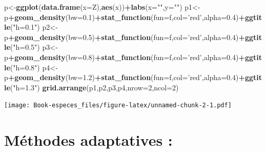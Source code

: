 \documentclass[
]{book}
\newenvironment{Shaded}{\begin{snugshade}}{\end{snugshade}}
\newcommand{\DataTypeTok}[1]{\textcolor[rgb]{0.13,0.29,0.53}{#1}}
\newcommand{\DecValTok}[1]{\textcolor[rgb]{0.00,0.00,0.81}{#1}}
\newcommand{\FloatTok}[1]{\textcolor[rgb]{0.00,0.00,0.81}{#1}}
\newcommand{\KeywordTok}[1]{\textcolor[rgb]{0.13,0.29,0.53}{\textbf{#1}}}
\newcommand{\NormalTok}[1]{#1}
\newcommand{\OperatorTok}[1]{\textcolor[rgb]{0.81,0.36,0.00}{\textbf{#1}}}
\newcommand{\StringTok}[1]{\textcolor[rgb]{0.31,0.60,0.02}{#1}}
\theoremstyle{definition}
\theoremstyle{definition}
\theoremstyle{definition}
\theoremstyle{definition}
\theoremstyle{remark}
\begin{document}
\begin{Shaded}
\begin{Highlighting}[]
\NormalTok{p<-}\KeywordTok{ggplot}\NormalTok{(}\KeywordTok{data.frame}\NormalTok{(}\DataTypeTok{x=}\NormalTok{Z),}\KeywordTok{aes}\NormalTok{(x))}\OperatorTok{+}\KeywordTok{labs}\NormalTok{(}\DataTypeTok{x=}\StringTok{""}\NormalTok{,}\DataTypeTok{y=}\StringTok{""}\NormalTok{)}
\NormalTok{p1<-p}\OperatorTok{+}\KeywordTok{geom_density}\NormalTok{(}\DataTypeTok{bw=}\FloatTok{0.1}\NormalTok{)}\OperatorTok{+}\KeywordTok{stat_function}\NormalTok{(}\DataTypeTok{fun=}\NormalTok{f,}\DataTypeTok{col=}\StringTok{'red'}\NormalTok{,}\DataTypeTok{alpha=}\FloatTok{0.4}\NormalTok{)}\OperatorTok{+}\KeywordTok{ggtitle}\NormalTok{(}\StringTok{"h=0.1"}\NormalTok{)}
\NormalTok{p2<-p}\OperatorTok{+}\KeywordTok{geom_density}\NormalTok{(}\DataTypeTok{bw=}\FloatTok{0.5}\NormalTok{)}\OperatorTok{+}\KeywordTok{stat_function}\NormalTok{(}\DataTypeTok{fun=}\NormalTok{f,}\DataTypeTok{col=}\StringTok{'red'}\NormalTok{,}\DataTypeTok{alpha=}\FloatTok{0.4}\NormalTok{)}\OperatorTok{+}\KeywordTok{ggtitle}\NormalTok{(}\StringTok{"h=0.5"}\NormalTok{)}
\NormalTok{p3<-p}\OperatorTok{+}\KeywordTok{geom_density}\NormalTok{(}\DataTypeTok{bw=}\FloatTok{0.8}\NormalTok{)}\OperatorTok{+}\KeywordTok{stat_function}\NormalTok{(}\DataTypeTok{fun=}\NormalTok{f,}\DataTypeTok{col=}\StringTok{'red'}\NormalTok{,}\DataTypeTok{alpha=}\FloatTok{0.4}\NormalTok{)}\OperatorTok{+}\KeywordTok{ggtitle}\NormalTok{(}\StringTok{"h=0.8"}\NormalTok{)}
\NormalTok{p4<-p}\OperatorTok{+}\KeywordTok{geom_density}\NormalTok{(}\DataTypeTok{bw=}\FloatTok{1.2}\NormalTok{)}\OperatorTok{+}\KeywordTok{stat_function}\NormalTok{(}\DataTypeTok{fun=}\NormalTok{f,}\DataTypeTok{col=}\StringTok{'red'}\NormalTok{,}\DataTypeTok{alpha=}\FloatTok{0.4}\NormalTok{)}\OperatorTok{+}\KeywordTok{ggtitle}\NormalTok{(}\StringTok{"h=1.3"}\NormalTok{)}
\KeywordTok{grid.arrange}\NormalTok{(p1,p2,p3,p4,}\DataTypeTok{nrow=}\DecValTok{2}\NormalTok{,}\DataTypeTok{ncol=}\DecValTok{2}\NormalTok{)}
\end{Highlighting}
\end{Shaded}

\texttt{[image: Book-especes\_files/figure-latex/unnamed-chunk-2-1.pdf]}

\hypertarget{muxe9thodes-adaptatives}{%
\chapter{Méthodes adaptatives :}\label{muxe9thodes-adaptatives}}
\end{document}
